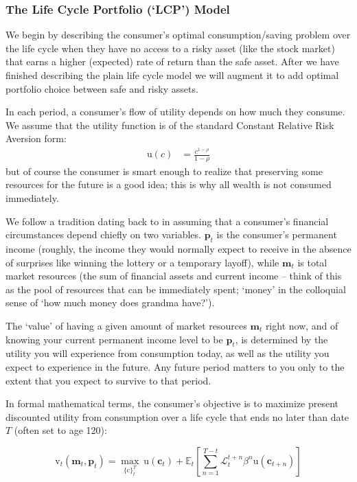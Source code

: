 \documentclass{article}
\newcommand{\CRRA}{\rho}
\newcommand{\uFunc}{\mathrm{u}}
\newcommand{\pLvl}{\mathbf{p}}
\newcommand{\mLvl}{\mathbf{m}}
\newcommand{\DiscFac}{\beta}
\newcommand{\cFunc}{\mathrm{c}}
\newcommand{\vFunc}{\mathrm{v}}
\newcommand{\Alive}{\mathcal{L}}
\newcommand{\cLvl}{\mathbf{c}}
\newcommand{\Ex}{\mathbb{E}}
\begin{document}
\subsubsection{The Life Cycle Portfolio (`LCP') Model}

We begin by describing the consumer's optimal consumption/saving problem over the life cycle when they have no access to a risky asset (like the stock market) that earns a higher (expected) rate of return than the safe asset. After we have finished describing the plain life cycle model we will augment it to add optimal portfolio choice between safe and risky assets.

In each period, a consumer's flow of utility depends on how much they consume. We assume that the utility function is of the standard Constant Relative Risk Aversion form:
\begin{align}
    \uFunc(c) & = \frac{c^{1-\CRRA}}{1-\CRRA}
\end{align}
but of course the consumer is smart enough to realize that preserving some resources for the future is a good idea; this is why all wealth is not consumed immediately.

We follow a tradition dating back to \cite{friedman1957} in assuming that a consumer's financial circumstances depend chiefly on two variables. $\pLvl_{t}$ is the consumer's permanent income (roughly, the income they would normally expect to receive in the absence of surprises like winning the lottery or a temporary layoff), while $\mLvl_{t}$ is total market resources (the sum of financial assets and current income -- think of this as the pool of resources that can be immediately spent; `money' in the colloquial sense of `how much money does grandma have?').

The `value' of having a given amount of market resources $\mLvl_{t}$ right now, and of knowing your current permanent income level to be $\pLvl_{t}$, is determined by the utility you will experience from consumption today, as well as the utility you expect to experience in the future. Any future period matters to you only to the extent that you expect to survive to that period.

In formal mathematical terms, the consumer's objective is to maximize present discounted utility from consumption over a life cycle that ends no later than date $T$ (often set to age 120):

\begin{equation}
\label{eq:lifecyclemax}
\pmb{\vFunc}_{t}(\mLvl_{t},\pLvl_{t}) = \max_{\{\cFunc\}_{t}^{T}} ~ \uFunc(\cLvl_{t})+\Ex_{t}\left[\sum_{n=1}^{T-t} \Alive_{t}^{t+n}{\DiscFac}^{n} \uFunc(\cLvl_{t+n}) \right]
\end{equation}
\end{document}
